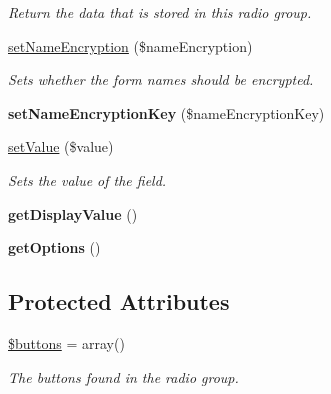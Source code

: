 \begin{DoxyCompactItemize}
\begin{DoxyCompactList}\small\item\em Return the data that is stored in this radio group. \item\end{DoxyCompactList}\item 
\hyperlink{class_radio_group_a923a901a0e646cd3850b244ff1c08c8e}{setNameEncryption} (\$nameEncryption)
\begin{DoxyCompactList}\small\item\em Sets whether the form names should be encrypted. \item\end{DoxyCompactList}\item 
\hypertarget{class_radio_group_aa4cc6fbc101d78ebb03e9451e8ab8be7}{
{\bfseries setNameEncryptionKey} (\$nameEncryptionKey)}
\label{class_radio_group_aa4cc6fbc101d78ebb03e9451e8ab8be7}

\item 
\hyperlink{class_radio_group_a32a481506b800b668ee55022681f8b2f}{setValue} (\$value)
\begin{DoxyCompactList}\small\item\em Sets the value of the field. \item\end{DoxyCompactList}\item 
\hypertarget{class_radio_group_a5a8c26a3164b32f2242fab7c6b5f23b1}{
{\bfseries getDisplayValue} ()}
\label{class_radio_group_a5a8c26a3164b32f2242fab7c6b5f23b1}

\item 
\hypertarget{class_radio_group_ad334de2c3b8c02f59b4559c67f2b8906}{
{\bfseries getOptions} ()}
\label{class_radio_group_ad334de2c3b8c02f59b4559c67f2b8906}

\end{DoxyCompactItemize}
\subsection*{Protected Attributes}
\begin{DoxyCompactItemize}
\item 
\hypertarget{class_radio_group_ade993f1eeb8be3cd72f00653a575e713}{
\hyperlink{class_radio_group_ade993f1eeb8be3cd72f00653a575e713}{\$buttons} = array()}
\label{class_radio_group_ade993f1eeb8be3cd72f00653a575e713}

\begin{DoxyCompactList}\small\item\em The buttons found in the radio group. \item\end{DoxyCompactList}\end{DoxyCompactItemize}



